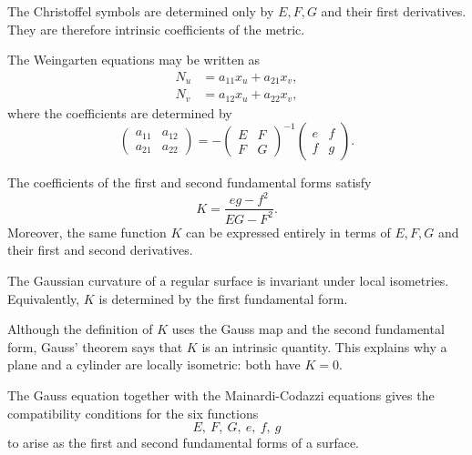\documentclass[12pt, oneside]{book}
\begin{document}
\begin{remark}
    The Christoffel symbols are determined only by $E,F,G$ and their first
    derivatives.  They are therefore intrinsic coefficients of the metric.
\end{remark}

\begin{proposition}
    The Weingarten equations may be written as
    \[
        \begin{aligned}
            N_u & = a_{11}x_u+a_{21}x_v, \\
            N_v & = a_{12}x_u+a_{22}x_v,
        \end{aligned}
    \]
    where the coefficients are determined by
    \[
        \begin{pmatrix}
            a_{11} & a_{12} \\
            a_{21} & a_{22}
        \end{pmatrix}
        =
        -\begin{pmatrix}
            E & F \\
            F & G
        \end{pmatrix}^{-1}
        \begin{pmatrix}
            e & f \\
            f & g
        \end{pmatrix}.
    \]
\end{proposition}

\begin{theorem}
    The coefficients of the first and second fundamental forms satisfy
    \[
        K=\frac{eg-f^2}{EG-F^2}.
    \]
    Moreover, the same function $K$ can be expressed entirely in terms of
    $E,F,G$ and their first and second derivatives.
\end{theorem}

\begin{theorem}
    The Gaussian curvature of a regular surface is invariant under local
    isometries.  Equivalently, $K$ is determined by the first fundamental form.
\end{theorem}

\begin{remark}
    Although the definition of $K$ uses the Gauss map and the second fundamental
    form, Gauss' theorem says that $K$ is an intrinsic quantity.  This explains
    why a plane and a cylinder are locally isometric: both have $K=0$.
\end{remark}

\begin{theorem}
    The Gauss equation together with the Mainardi-Codazzi equations gives the
    compatibility conditions for the six functions
    \[
        E,\ F,\ G,\ e,\ f,\ g
    \]
    to arise as the first and second fundamental forms of a surface.
\end{theorem}
\end{document}
